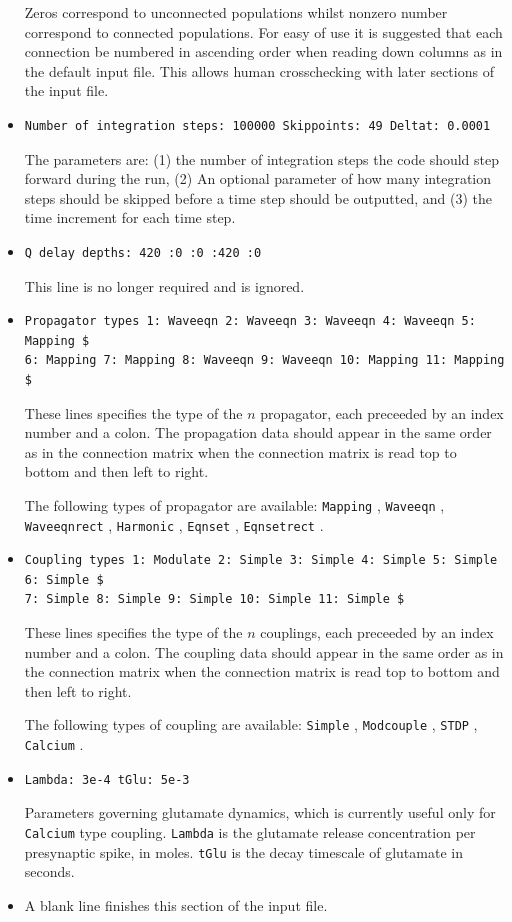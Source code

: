 \documentclass[12pt,a4paper]{article}
\newcommand{\type}[1]{ {\small\small\tt #1} }
\begin{document}
\begin{itemize}
Zeros correspond to unconnected populations whilst nonzero number correspond to connected populations. For easy of use it is suggested that each connection be numbered in ascending order when reading down columns as in the default input file. This allows human crosschecking with later sections of the input file.
\item
\begin{lstlisting}
Number of integration steps: 100000 Skippoints: 49 Deltat: 0.0001
\end{lstlisting}
The parameters are: 
(1) the number of integration steps the code should step forward during the run, (2) An optional parameter of how many integration steps should be skipped before a time step should be outputted, and (3) the time increment for each time step.

\item
\begin{lstlisting}
Q delay depths: 420 :0 :0 :420 :0
\end{lstlisting} This line is no longer required 
and is ignored.

\item
\begin{lstlisting}
Propagator types 1: Waveeqn 2: Waveeqn 3: Waveeqn 4: Waveeqn 5: Mapping $
6: Mapping 7: Mapping 8: Waveeqn 9: Waveeqn 10: Mapping 11: Mapping $
\end{lstlisting}
These lines specifies the type of the $n$ propagator, each preceeded by an index number and a colon. The propagation data should appear in the same order as in the connection matrix when the connection matrix is read top to bottom and then left to right.

The following types of propagator are available: \type{Mapping}, \type{Waveeqn},\type{Waveeqnrect}, \type{Harmonic}, \type{Eqnset}, \type{Eqnsetrect}.
\item
\begin{lstlisting}
Coupling types 1: Modulate 2: Simple 3: Simple 4: Simple 5: Simple 6: Simple $ 
7: Simple 8: Simple 9: Simple 10: Simple 11: Simple $
\end{lstlisting}
These lines specifies the type of the $n$ couplings, each preceeded by an index number and a colon. The coupling data should appear in the same order as in the connection matrix when the connection matrix is read top to bottom and then left to right.

The following types of coupling are available: \type{Simple}, \type{Modcouple}, \type{STDP}, \type{Calcium}.
\item
\begin{lstlisting}
Lambda: 3e-4 tGlu: 5e-3
\end{lstlisting}
Parameters governing glutamate dynamics, which is currently useful only for \type{Calcium} type coupling. \type{Lambda} is the glutamate release concentration per presynaptic spike, in moles. \type{tGlu} is the decay timescale of glutamate in seconds.
\item A blank line finishes this section of the input file.
\end{itemize}
\end{document}
